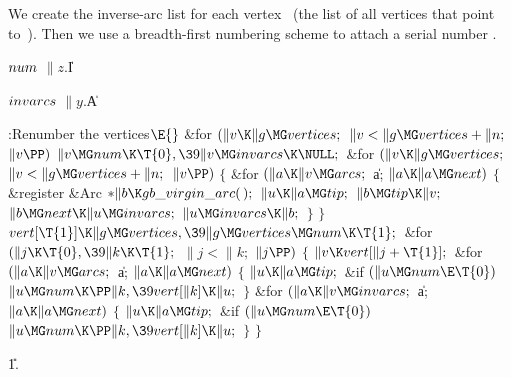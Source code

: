 We create the inverse-arc list for each
vertex~ (the list of all
vertices that point to~). Then we use a breadth-first numbering scheme
to attach a serial number .

\Y\B\4\D$\\{num}$ \5
$\|z.{}$\|I\par
\B\4\D$\\{invarcs}$ \5
$\|y.{}$\|A\par
\Y\B\4:Renumber the vertices\X${}\E{}$\6
\&{for} ${}(\|v\K\|g\MG\\{vertices};{}$ ${}\|v<\|g\MG\\{vertices}+\|n;{}$ ${}%
\|v\PP){}$\1\5
${}\|v\MG\\{num}\K\T{0},\39\|v\MG\\{invarcs}\K\NULL;{}$\2\6
\&{for} ${}(\|v\K\|g\MG\\{vertices};{}$ ${}\|v<\|g\MG\\{vertices}+\|n;{}$ ${}%
\|v\PP){}$\5
${}\{{}$\1\6
\&{for} ${}(\|a\K\|v\MG\\{arcs};{}$ \|a; ${}\|a\K\|a\MG\\{next}){}$\5
${}\{{}$\1\6
\&{register} \&{Arc} ${}{*}\|b\K\\{gb\_virgin\_arc}(\,);{}$\7
${}\|u\K\|a\MG\\{tip};{}$\6
${}\|b\MG\\{tip}\K\|v;{}$\6
${}\|b\MG\\{next}\K\|u\MG\\{invarcs};{}$\6
${}\|u\MG\\{invarcs}\K\|b;{}$\6
\4${}\}{}$\2\6
\4${}\}{}$\2\6
${}\\{vert}[\T{1}]\K\|g\MG\\{vertices},\39\|g\MG\\{vertices}\MG\\{num}\K%
\T{1};{}$\6
\&{for} ${}(\|j\K\T{0},\39\|k\K\T{1};{}$ ${}\|j<\|k;{}$ ${}\|j\PP){}$\5
${}\{{}$\1\6
${}\|v\K\\{vert}[\|j+\T{1}];{}$\6
\&{for} ${}(\|a\K\|v\MG\\{arcs};{}$ \|a; ${}\|a\K\|a\MG\\{next}){}$\5
${}\{{}$\1\6
${}\|u\K\|a\MG\\{tip};{}$\6
\&{if} ${}(\|u\MG\\{num}\E\T{0}){}$\1\5
${}\|u\MG\\{num}\K\PP\|k,\39\\{vert}[\|k]\K\|u;{}$\2\6
\4${}\}{}$\2\6
\&{for} ${}(\|a\K\|v\MG\\{invarcs};{}$ \|a; ${}\|a\K\|a\MG\\{next}){}$\5
${}\{{}$\1\6
${}\|u\K\|a\MG\\{tip};{}$\6
\&{if} ${}(\|u\MG\\{num}\E\T{0}){}$\1\5
${}\|u\MG\\{num}\K\PP\|k,\39\\{vert}[\|k]\K\|u;{}$\2\6
\4${}\}{}$\2\6
\4${}\}{}$\2\par
\U1.\fi

